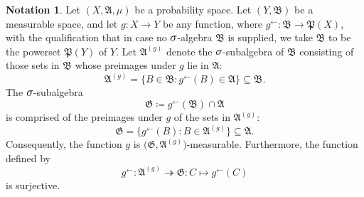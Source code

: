 \documentclass[
twoside=true,
paper=letter,
fontsize=11pt,
pagesize=auto,
leqno,
openany,
headsepline,
overfullrule,
]{scrbook}
\theoremstyle{plain}
\theoremstyle{plain}
\theoremstyle{definition}
\newtheorem{notn}[thm]{Notation}
\theoremstyle{bfnoteitalic}
\theoremstyle{bfnoteroman}
\newcommand{\sigalg}[1]{\mathfrak{#1}}
\newcommand{\definedby}{\coloneqq}
\newcommand{\textsigma}{\hbox{\large{$\sigma$}}\kern-1pt}
\newcommand{\preimage}[1]{#1^{\leftarrow}}
\newcommand{\meets}{\cap}
\newcommand{\sigmaalgebra}{\sigalg{A}}
\newcommand{\sigmaalgebraii}{\sigalg{B}}
\newcommand{\powerset}{\mathfrak{P}}
\newcommand{\functionii}{g}
\newcommand{\measurespace}{X}
\newcommand{\measurespaceii}{Y}
\newcommand{\measure}{\mu}
\begin{document}
\begin{notn}
Let $(\measurespace, \sigmaalgebra,\measure)$ be a probability space.
Let $(\measurespaceii, \sigmaalgebraii)$ be a measurable space, and let $\functionii:\measurespace\to\measurespaceii$ be any function, where $\preimage{\functionii}:\sigmaalgebraii\to\powerset(\measurespace)$,
with the qualification that in case no $\textsigma$-algebra $\sigmaalgebraii$ is supplied, we take $\sigmaalgebraii$ to be the powerset $\powerset(\measurespaceii)$ of $\measurespaceii$. 
Let $\sigmaalgebra^{(\functionii)}$ denote the $\textsigma$-subalgebra of $\sigmaalgebraii$ consisting of those sets in $\sigmaalgebraii$ whose preimages under $\functionii$ lie in $\sigmaalgebra$:
\[
\sigmaalgebra^{(\functionii)}
=
\{ B\in \sigmaalgebraii : \preimage{\functionii}(B)\in \sigmaalgebra \} 
\subseteq \sigmaalgebraii.
\]
The $\textsigma$-subalgebra
\[
\sigalg{G}\definedby
\preimage{\functionii}(\sigmaalgebraii)\meets\sigmaalgebra
\]
is comprised of the preimages under $\functionii$ of the sets in $\sigmaalgebra^{(\functionii)}$:
\[
\sigalg{G}
=
\bigl\{ \preimage{\functionii}(B) : B \in \sigmaalgebra^{(\functionii)} \bigr\} 
\subseteq \sigmaalgebra.
\]
Consequently, the function $\functionii$ is
$\bigl(\sigalg{G}, \sigmaalgebra^{(\functionii)}\bigr)$\hyp{}measurable. Furthermore, the function defined by
\[
\preimage{\functionii}:\sigmaalgebra^{(\functionii)} 
\twoheadrightarrow
\sigalg{G}:
C \mapsto \preimage{\functionii}(C)
\]
is surjective.
\end{notn}
\end{document}
